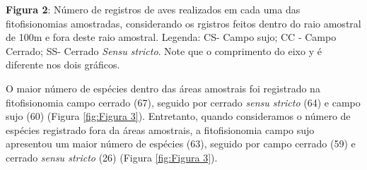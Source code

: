 \textbf{Figura 2}: Número de registros de aves realizados em cada uma das fitofisionomias amostradas, considerando os rgistros feitos dentro do raio amostral de 100m e fora deste raio amostral. Legenda: CS- Campo sujo; CC -  Campo Cerrado; SS- Cerrado \textit{Sensu stricto}. Note que o comprimento do eixo y é diferente nos dois gráficos.

O maior número de espécies dentro das áreas amostrais foi registrado na fitofisionomia campo cerrado (67), seguido por cerrado \textit{sensu stricto} (64) e campo sujo (60) (Figura \ref{fig:Figura 3}). Entretanto, quando consideramos o número de espécies registrado fora da áreas amostrais, a fitofisionomia campo sujo apresentou um maior número de espécies (63), seguido por campo cerrado (59) e cerrado \textit{sensu stricto} (26) (Figura \ref{fig:Figura 3}).

